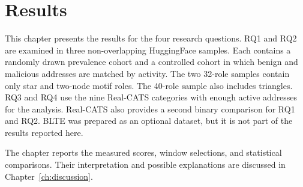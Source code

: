 \chapter{Results}
\label{ch:results}


This chapter presents the results for the four research questions. RQ1 and RQ2
are examined in three non-overlapping HuggingFace samples. Each contains a
randomly drawn prevalence cohort and a controlled cohort in which benign and
malicious addresses are matched by activity. The
two 32-role samples contain only star and two-node motif roles. The 40-role
sample also includes triangles. RQ3 and RQ4 use the nine
Real-CATS categories with enough active addresses for the analysis. Real-CATS
also provides a second binary comparison for RQ1 and RQ2. BLTE was prepared as
an optional dataset, but it is not part of the results reported here.

The chapter reports the measured scores, window selections, and statistical
comparisons. Their interpretation and possible explanations are discussed in
Chapter~\ref{ch:discussion}.

